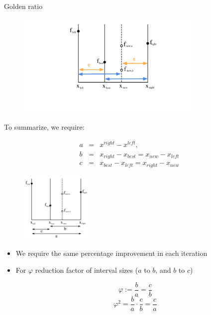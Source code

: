 \documentclass[11pt,compress,t,notes=noshow, xcolor=table]{beamer}
\begin{document}
\begin{vbframe}{Golden ratio}
\begin{figure}
\includegraphics[width=0.8\textwidth]{figure_man/goldensec-4.png}\\
\end{figure}

\framebreak 

To summarize, we require: 

\begin{eqnarray*}
    a &=& x^{right}-x^{left}, \\
    b &=& x_{right} - x_{best} = x_{new} - x_{left} \\
    c &=& x_{best} - x_{left} = x_{right} - x_{new}
\end{eqnarray*}

\vspace*{-0.3cm}

\begin{figure}
\includegraphics[width=0.3\textwidth]{figure_man/goldensec.png}\\
\end{figure}

\framebreak 

\begin{itemize}
\item We require the same percentage improvement in each iteration
\item For $\varphi$ reduction factor of interval sizes ($a$ to $b$, and $b$ to $c$)

$$
\varphi := \frac{b}{a} = \frac{c}{b}
$$
$$
\varphi^2 = \frac{b}{a} \cdot \frac{c}{b} = \frac{c}{a}
$$


\end{itemize}
\end{vbframe}
\end{document}

